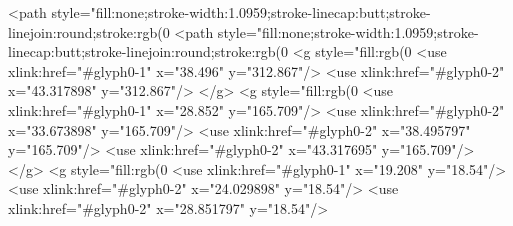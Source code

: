 <path style="fill:none;stroke-width:1.0959;stroke-linecap:butt;stroke-linejoin:round;stroke:rgb(0%
<path style="fill:none;stroke-width:1.0959;stroke-linecap:butt;stroke-linejoin:round;stroke:rgb(0%
<g style="fill:rgb(0%
  <use xlink:href="#glyph0-1" x="38.496" y="312.867"/>
  <use xlink:href="#glyph0-2" x="43.317898" y="312.867"/>
</g>
<g style="fill:rgb(0%
  <use xlink:href="#glyph0-1" x="28.852" y="165.709"/>
  <use xlink:href="#glyph0-2" x="33.673898" y="165.709"/>
  <use xlink:href="#glyph0-2" x="38.495797" y="165.709"/>
  <use xlink:href="#glyph0-2" x="43.317695" y="165.709"/>
</g>
<g style="fill:rgb(0%
  <use xlink:href="#glyph0-1" x="19.208" y="18.54"/>
  <use xlink:href="#glyph0-2" x="24.029898" y="18.54"/>
  <use xlink:href="#glyph0-2" x="28.851797" y="18.54"/>

